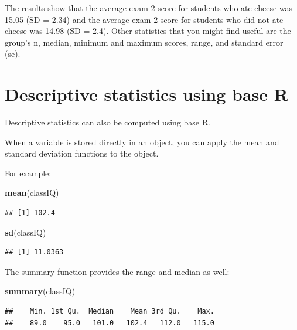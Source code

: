 \documentclass[
]{book}
\newenvironment{Shaded}{\begin{snugshade}}{\end{snugshade}}
\newcommand{\KeywordTok}[1]{\textcolor[rgb]{0.13,0.29,0.53}{\textbf{#1}}}
\newcommand{\NormalTok}[1]{#1}
\begin{document}
The results show that the average exam 2 score for students who ate cheese was 15.05 (SD = 2.34) and the average exam 2 score for students who did not ate cheese was 14.98 (SD = 2.4). Other statistics that you might find useful are the group's n, median, minimum and maximum scores, range, and standard error (se).

\hypertarget{descriptive-statistics-using-base-r}{%
\section{Descriptive statistics using base R}\label{descriptive-statistics-using-base-r}}

Descriptive statistics can also be computed using base R.

When a variable is stored directly in an object, you can apply the mean and standard deviation functions to the object.

For example:

\begin{Shaded}
\begin{Highlighting}[]
\KeywordTok{mean}\NormalTok{(classIQ)}
\end{Highlighting}
\end{Shaded}

\begin{verbatim}
## [1] 102.4
\end{verbatim}

\begin{Shaded}
\begin{Highlighting}[]
\KeywordTok{sd}\NormalTok{(classIQ)}
\end{Highlighting}
\end{Shaded}

\begin{verbatim}
## [1] 11.0363
\end{verbatim}

The summary function provides the range and median as well:

\begin{Shaded}
\begin{Highlighting}[]
\KeywordTok{summary}\NormalTok{(classIQ)}
\end{Highlighting}
\end{Shaded}

\begin{verbatim}
##    Min. 1st Qu.  Median    Mean 3rd Qu.    Max. 
##    89.0    95.0   101.0   102.4   112.0   115.0
\end{verbatim}
\end{document}
